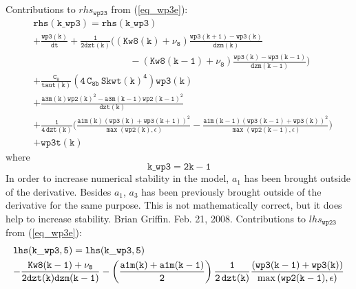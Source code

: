 \documentclass[11pt,fleqn]{article}
\begin{document}
%
Contributions to $rhs_{\mathtt{wp23}}$ from (\ref{eq_wp3e}):
%
\begin{equation}
\begin{split}
& \mathtt{ rhs(k\_wp3) = rhs(k\_wp3) } \\
& \mathtt{
  + \frac{wp3(k)}{dt} 
  + \frac{1}{2dzt(k)}
      \bigg(
              \left(Kw8(k)+\nu_8\right)
              \frac{wp3(k+1)-wp3(k)}{dzm(k)} }  \\
& \mathtt{ \qquad \qquad \qquad \qquad \qquad
            - \left(Kw8(k-1)+\nu_8\right)
              \frac{wp3(k)-wp3(k-1)}{dzm(k-1)}
      \bigg)
  } \\
& \mathtt{
+ \frac{C_8}{taut(k)}
   \left( 4 \, C_{8b} \, {Skwt(k)}^4 \right) wp3(k)
  } \\
& \mathtt{
  + \frac{a3m(k) wp2(k)^2 - a3m(k-1) wp2(k-1)^2 }
         {dzt(k)}
  } \\
& \mathtt{
  + \frac{1}{4 \, dzt(k)}
    \bigg(
      \frac{ a1m(k)
             \left(wp3(k)+wp3(k+1)\right)^2 }
           { \max\left( wp2(k), \epsilon \right) }
     -\frac{ a1m(k-1)
             \left(wp3(k-1)+wp3(k)\right)^2 }
           { \max\left( wp2(k-1), \epsilon \right) }
    \bigg)
  } \\
& \mathtt{
+ wp3t(k)
  }
\end{split}
\end{equation}
%
where
%
\begin{equation}
\mathtt{ k\_wp3 = 2 k - 1}
\end{equation}
%
In order to increase numerical stability in the model, $a_{1}$ has been brought
outside of the derivative.  Besides $a_{1}$, $a_{3}$ has been previously brought
outside of the derivative for the same purpose.  This is not mathematically
correct, but it does help to increase stability.  Brian Griffin.  Feb. 21, 2008.
% 
Contributions to $lhs_{\mathtt{wp23}}$ from (\ref{eq_wp3e}):
%
\begin{equation}
\begin{split}
& \mathtt{ lhs(k\_wp3,5) = lhs(k\_wp3,5) }\\
& \mathtt{
- \frac{Kw8(k-1)+\nu_8}{2 dzt(k)dzm(k-1)}
- \left(\frac{a1m(k)+a1m(k-1)}{2}\right) \frac{1}{2 \, dzt(k)}
  \frac{ \left(wp3(k-1)+wp3(k)\right) }
       { \max\left( wp2(k-1), \epsilon \right) }
}
\end{split}
\end{equation}
\end{document}
